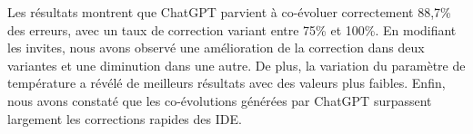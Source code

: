 Les résultats montrent que ChatGPT parvient à co-évoluer correctement 88,7\% des erreurs, avec un taux de correction variant entre 75\% et 100\%. En modifiant les invites, nous avons observé une amélioration de la correction dans deux variantes et une diminution dans une autre. De plus, la variation du paramètre de température a révélé de meilleurs résultats avec des valeurs plus faibles. Enfin, nous avons constaté que les co-évolutions générées par ChatGPT surpassent largement les corrections rapides des IDE.


